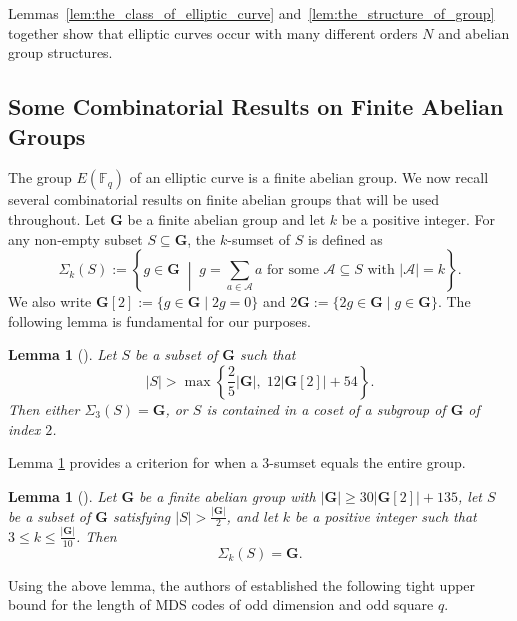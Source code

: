 \documentclass[journal,12pt,onecolumn]{IEEEtran}
\newtheorem{lemma}[theorem]{Lemma}
\newcommand{\sumset}{\Sigma}
\begin{document}
Lemmas~\ref{lem:the_class_of_elliptic_curve} and~\ref{lem:the_structure_of_group} together show that elliptic curves occur with many different orders $N$ and abelian group structures.






\subsection{Some Combinatorial Results on Finite Abelian Groups}

The group $E(\mathbb{F}_q)$ of an elliptic curve is a finite abelian group. We now recall several combinatorial results on finite abelian groups that will be used throughout. Let $\mathbf{G}$ be a finite abelian group and let $k$ be a positive integer. For any non‑empty subset $S \subseteq \mathbf{G}$,
the $k$-sumset of $S$ is defined as
\[
\sumset_k(S) := \left\{ g \in \mathbf{G} \; \middle| \; g = \sum_{a \in \mathcal{A}} a \text{ for some } \mathcal{A} \subseteq S \text{ with } |\mathcal{A}| = k \right\}.
\]
We also write $\mathbf{G}[2] := \{ g \in \mathbf{G} \mid 2g = 0 \}$ and $2\mathbf{G} := \{ 2g \in \mathbf{G} \mid g \in \mathbf{G} \}$. The following lemma is fundamental for our purposes.

\begin{lemma}[\cite{MR4564628}]\label{lem:tight:first_combination_result}
Let $S$ be a subset of $\mathbf{G}$ such that
\[
|S| > \max \left\{ \frac{2}{5}|\mathbf{G}|,\; 12|\mathbf{G}[2]| + 54 \right\}.
\]
Then either $\sumset_3(S) = \mathbf{G}$, or $S$ is contained in a coset of a subgroup of $\mathbf{G}$ of index $2$.
\end{lemma}

Lemma \ref{lem:tight:first_combination_result} provides a criterion for when a $3$-sumset equals the entire group.

\begin{lemma}[\cite{MR4564628}]\label{lem:G_combination}
 Let $\mathbf{G}$ be a finite abelian group with $|\mathbf{G}| \ge 30|\mathbf{G}[2]| + 135$, let $S$ be a subset of $\mathbf{G}$ satisfying $|S| > \frac{|\mathbf{G}|}{2}$, and let $k$ be a positive integer such that $3 \le k \le \frac{|\mathbf{G}|}{10}$. Then
\[
\sumset_k(S) =\mathbf{G}.
\]
\end{lemma}

Using the above lemma, the authors of \cite{MR4564628} established the following tight upper bound for the length of MDS codes of odd dimension and odd square $q$.
\end{document}
